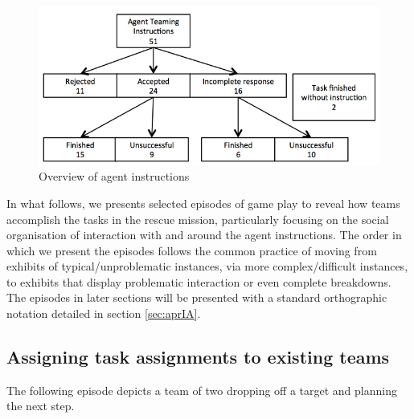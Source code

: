 \begin{figure}[ht]
 \includegraphics[width=1\textwidth]{img/study2/system/agentInstructions}
\caption{Overview of agent instructions}
\label{fig:study2agentInstructions}
\end{figure}

In what follows, we presents selected episodes of game play to reveal how teams accomplish the tasks in the rescue mission, particularly focusing on the social organisation of interaction with and around the agent instructions. The order in which we present the episodes follows the common practice of moving from exhibits of typical/unproblematic instances, via more complex/difficult instances, to exhibits that display problematic interaction or even complete breakdowns. The episodes in later sections will be presented with a standard orthographic notation detailed in section \ref{sec:aprIA}.


\subsection{Assigning task assignments to existing teams}
The following episode depicts a team of two dropping off a target and planning the next step.\\

